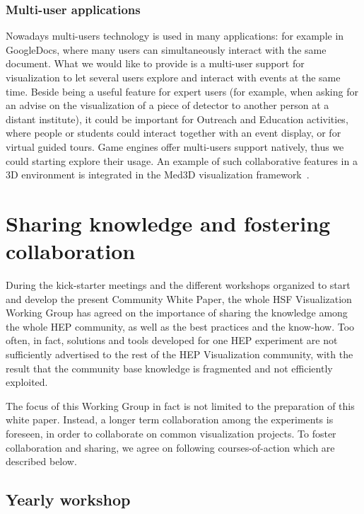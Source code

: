 \documentclass[12pt,a4paper]{article}
\begin{document}
\hypertarget{multi-user}{%
\subsubsection{Multi-user applications}\label{multi-user}}

Nowadays multi-users technology is used in many applications: for example in GoogleDocs, where many users can simultaneously
interact with the same document. What we would like to provide is a multi-user support for visualization to let several users
explore and interact with events at the same time. Beside being a useful feature for expert users (for example, when asking for an advise on the visualization of a piece of detector to another person at a distant institute), it could be important for
Outreach and Education activities, where people or students could interact together with an event display, or for virtual guided tours.
Game engines offer multi-users support natively, thus we could starting explore their usage.
An example of such collaborative features in a 3D environment is integrated in the Med3D visualization framework~\cite{Bohak2017}.

\hypertarget{sharing-knowledge}{%
\section{Sharing knowledge and fostering collaboration}\label{sharing-knowledge}}

During the kick-starter meetings and the different workshops organized to start and develop the present Community White Paper,
the whole HSF Visualization Working Group has agreed on the importance of sharing the knowledge among the whole HEP community,
as well as the best practices and the know-how. Too often, in fact, solutions and tools developed for one HEP experiment are
not sufficiently advertised to the rest of the HEP Visualization community, with the result that the community base knowledge
is fragmented and not efficiently exploited.

The focus of this Working Group in fact is not limited to the preparation of this white paper. Instead, a longer term collaboration
among the experiments is foreseen, in order to collaborate on common visualization projects.
To foster collaboration and sharing, we agree on following courses-of-action which are described below.

\hypertarget{workshop}{%
\subsection{Yearly workshop}\label{workshop}}
\end{document}
